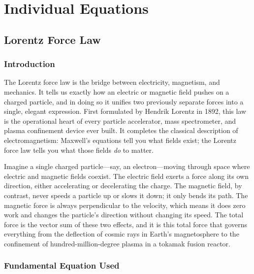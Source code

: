 \documentclass[11pt,openright]{book}
\begin{document}
\part{Individual Equations}



\chapter{Lorentz Force Law}

\section*{Introduction}

The Lorentz force law is the bridge between electricity, magnetism, and mechanics. It tells us exactly how an electric or magnetic field pushes on a charged particle, and in doing so it unifies two previously separate forces into a single, elegant expression. First formulated by Hendrik Lorentz in 1892, this law is the operational heart of every particle accelerator, mass spectrometer, and plasma confinement device ever built. It completes the classical description of electromagnetism: Maxwell's equations tell you what fields exist; the Lorentz force law tells you what those fields \emph{do} to matter.

Imagine a single charged particle---say, an electron---moving through space where electric and magnetic fields coexist. The electric field exerts a force along its own direction, either accelerating or decelerating the charge. The magnetic field, by contrast, never speeds a particle up or slows it down; it only bends its path. The magnetic force is always perpendicular to the velocity, which means it does zero work and changes the particle's direction without changing its speed. The total force is the vector sum of these two effects, and it is this total force that governs everything from the deflection of cosmic rays in Earth's magnetosphere to the confinement of hundred-million-degree plasma in a tokamak fusion reactor.
\section*{Fundamental Equation Used}
\end{document}
